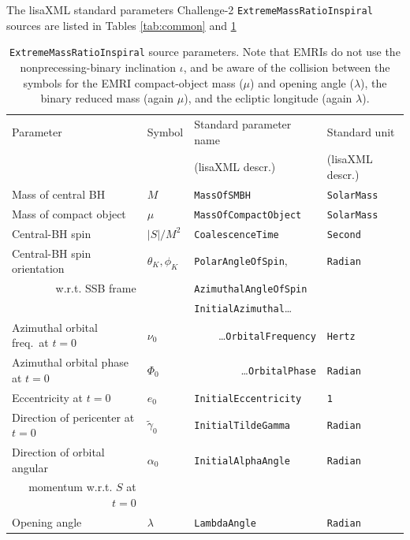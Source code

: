 \documentclass[12pt]{iopart}
\begin{document}
The lisaXML standard parameters Challenge-2 \texttt{ExtremeMassRatioInspiral} sources are listed in Tables \ref{tab:common} and \ref{tab:emri}
%
\begin{table}
\begin{tabular}{llll}
\hline
{Parameter} &
{Symbol} &
{Standard parameter name} &
{Standard unit} \\
& & (lisaXML descr.) & (lisaXML descr.) \\
\hline
Mass of central BH     & $M$      & \texttt{MassOfSMBH}           & \texttt{SolarMass} \\
Mass of compact object & $\mu$  & \texttt{MassOfCompactObject}  & \texttt{SolarMass} \\
Central-BH spin        & $|S|/M^2$  & \texttt{CoalescenceTime}      & \texttt{Second} \\
Central-BH spin orientation & $\theta_K, \phi_K$ & \texttt{PolarAngleOfSpin}, & \texttt{Radian} \\
 \multicolumn{1}{r}{w.r.t. SSB frame}  &                         & \texttt{AzimuthalAngleOfSpin} & \\ \hline
& & \texttt{InitialAzimuthal}\ldots & \\                   
Azimuthal orbital freq.\ at $t = 0$ & $\nu_0$ & \multicolumn{1}{r}{\ldots\texttt{OrbitalFrequency}} & \texttt{Hertz} \\
Azimuthal orbital phase at $t = 0$ & $\Phi_0$ & \multicolumn{1}{r}{\ldots\texttt{OrbitalPhase}} & \texttt{Radian} \\ \hline
Eccentricity at $t = 0$ & $e_0$ & \texttt{InitialEccentricity} & \texttt{1} \\
Direction of pericenter at $t = 0$ & $\tilde{\gamma}_0$ & \texttt{InitialTildeGamma} & \texttt{Radian} \\
Direction of orbital angular & $\alpha_0$ & \texttt{InitialAlphaAngle} & \texttt{Radian} \\
\multicolumn{1}{r}{momentum w.r.t. $S$ at $t = 0$} & & & \\
Opening angle & $\lambda$ & \texttt{LambdaAngle} & \texttt{Radian} \\ 
\hline
\end{tabular}
\caption{\texttt{ExtremeMassRatioInspiral} source parameters. Note that EMRIs do not use the nonprecessing-binary inclination $\iota$, and be aware of the collision between the symbols for the EMRI compact-object mass ($\mu$) and opening angle ($\lambda$), the binary reduced mass (again $\mu$), and the ecliptic longitude (again $\lambda$).\label{tab:emri}}
\end{table}
\end{document}
